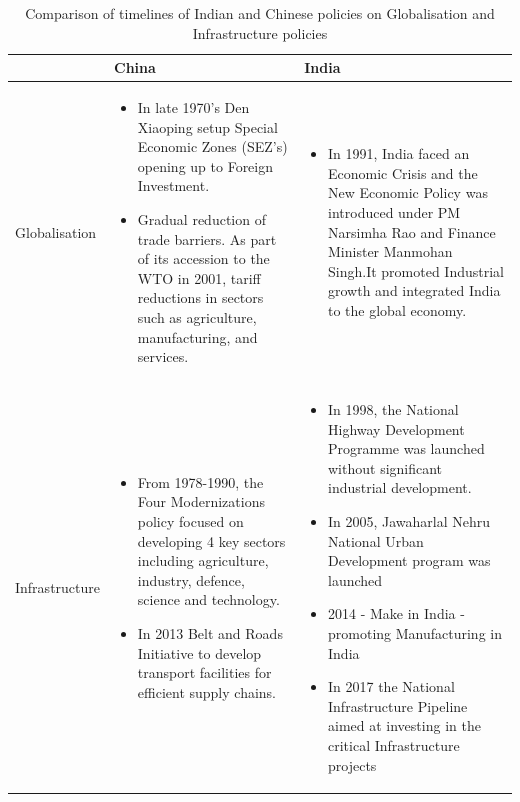 \documentclass{article}
\begin{document}
\newpage
    \begin{table}[htbp]
        \centering
        \caption{Comparison of timelines of Indian and Chinese policies on Globalisation and Infrastructure policies}
        \begin{tabular}{|p{3cm}|p{6cm}|p{6cm}|}
            \hline
            \textbf{} & \textbf{China} & \textbf{India} \\
            \hline
            Globalisation &
            \begin{itemize}[nosep , left=0pt , topsep=0pt]
                \item In late 1970’s Den Xiaoping setup Special Economic Zones (SEZ’s) opening up to Foreign Investment.
                \item Gradual reduction of trade barriers. As part of its accession to the WTO in 2001, tariff reductions in sectors such as agriculture, manufacturing, and services.
            \end{itemize}
            &
            \begin{itemize}[left=0pt , topsep=0pt]
                \item In 1991, India faced an Economic Crisis and the New Economic Policy was introduced under PM Narsimha Rao and Finance Minister Manmohan Singh.It promoted Industrial growth and integrated India to the global economy.
            \end{itemize} \\
            \hline
            Infrastructure &
            \begin{itemize}[nosep , left=0pt , topsep=0pt]
                \item From 1978-1990, the Four Modernizations policy focused on developing 4 key sectors including agriculture, industry, defence, science and technology.
                \item In 2013 Belt and Roads Initiative to develop transport facilities for efficient supply chains.
            \end{itemize} &
            \begin{itemize}[nosep , left=0pt , topsep=0pt]
                \item In 1998, the National Highway Development Programme was launched without significant industrial development.
                \item In 2005, Jawaharlal Nehru National Urban Development program was launched
                \item 2014 - Make in India - promoting Manufacturing in India
                \item In 2017 the National Infrastructure Pipeline aimed at investing in the critical Infrastructure projects

            \end{itemize}  \\
            \hline
        \end{tabular}
    \end{table}
\end{document}
